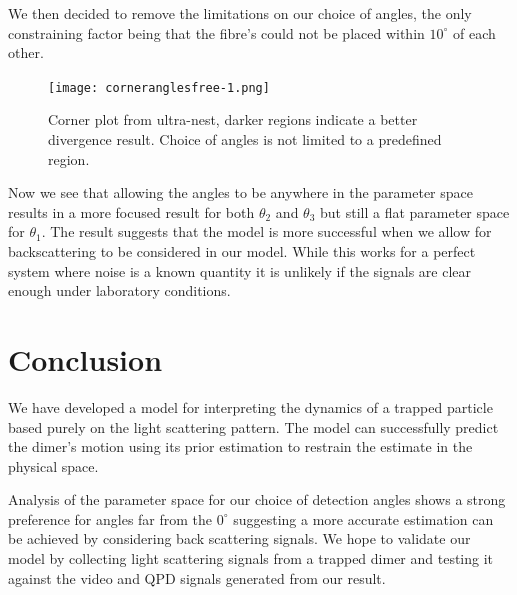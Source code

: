 \documentclass[11pt]{article}
\begin{document}
	We then decided to remove the limitations on our choice of angles, the only constraining factor being that the fibre's could not be placed within $10^{\circ}$ of each other. 
	
	\begin{figure} [h]
		\centering
		\texttt{[image: corneranglesfree-1.png]}
		\caption{Corner plot from ultra-nest, darker regions indicate a better divergence result. Choice of angles is not limited to a predefined region.}
	\end{figure}

	Now we see that allowing the angles to be anywhere in the parameter space results in a more focused result for both $\theta_2$ and $\theta_3$ but still a flat parameter space for $\theta_1$. The result suggests that the model is more successful when we allow for backscattering to be considered in our model. While this works for a perfect system where noise is a known quantity it is unlikely if the signals are clear enough under laboratory conditions. 
	
	\section*{Conclusion}
	We have developed a model for interpreting the dynamics of a trapped particle based purely on the light scattering pattern. The model can successfully predict the dimer's motion using its prior estimation to restrain the estimate in the physical space. 
	
	Analysis of the parameter space for our choice of detection angles shows a strong preference for angles far from the $0^{\circ}$ suggesting a more accurate estimation can be achieved by considering back scattering signals. We hope to validate our model by collecting light scattering signals from a trapped dimer and testing it against the video and QPD signals generated from our result. 
	
	 
	
\end{document}
